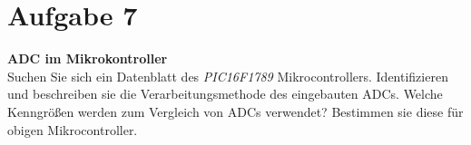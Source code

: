 \documentclass[12pt,a4paper,ngerman]{article}
\begin{document}
\pagebreak

\section{Aufgabe 7}

\begin{framed}
\textbf{ADC im Mikrokontroller} \\
Suchen Sie sich ein Datenblatt des \textit{PIC16F1789} Mikrocontrollers. Identifizieren und beschreiben sie die Verarbeitungsmethode des eingebauten ADCs. Welche Kenngrößen werden zum Vergleich von ADCs verwendet? Bestimmen sie diese für obigen Mikrocontroller. 
\end{framed}   
   
   
   
\end{document}

